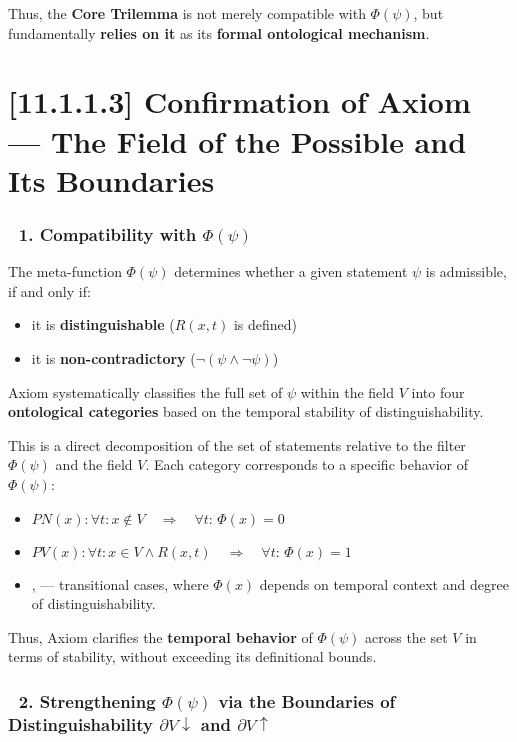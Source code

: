 \documentclass[12pt]{article}
\begin{document}
Thus, the \textbf{Core Trilemma} is not merely compatible with $\Phi(\psi)$, but fundamentally \textbf{relies on it} as its \textbf{formal ontological mechanism}.

\section*{[11.1.1.3] Confirmation of Axiom \text{[4]} — The Field of the Possible and Its Boundaries}

\subsubsection*{🔹 1. Compatibility with $\Phi(\psi)$}

The meta-function $\Phi(\psi)$ determines whether a given statement $\psi$ is admissible, if and only if:

\begin{itemize}
\item it is \textbf{distinguishable} ($R(x, t)$ is defined)
\item it is \textbf{non-contradictory} ($\neg(\psi \wedge \neg\psi)$)
\end{itemize}

Axiom \text{[4]} systematically classifies the full set of $\psi$ within the field $V$ into four \textbf{ontological categories} based on the temporal stability of distinguishability.

This is a direct decomposition of the set of statements relative to the filter $\Phi(\psi)$ and the field $V$. Each category corresponds to a specific behavior of $\Phi(\psi)$:

\begin{itemize}
\item \text{[4.1]} $PN(x): \forall t: x \notin V \quad \Rightarrow \quad \forall t:\, \Phi(x) = 0$
\item \text{[4.4]} $PV(x): \forall t: x \in V \wedge R(x,t) \quad \Rightarrow \quad \forall t:\, \Phi(x) = 1$
\item \text{[4.2]}, \text{[4.3]} — transitional cases, where $\Phi(x)$ depends on temporal context and degree of distinguishability.
\end{itemize}

Thus, Axiom \text{[4]} clarifies the \textbf{temporal behavior} of $\Phi(\psi)$ across the set $V$ in terms of stability, without exceeding its definitional bounds.

\subsubsection*{🔹 2. Strengthening $\Phi(\psi)$ via the Boundaries of Distinguishability $\partial V\downarrow$ and $\partial V\uparrow$}
\end{document}
